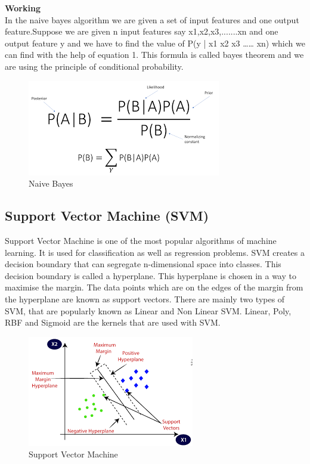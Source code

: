 \documentclass{article}
\begin{document}
\textbf{Working}\\
In the naive bayes algorithm we are given a set of input features and one output feature.Suppose we are given n input features say x1,x2,x3,.......xn and one output feature y and we have to find the value of P(y | x1 x2 x3 …… xn) which we can find with the help of equation 1. This formula is called bayes theorem and we are using the principle of conditional probability. 

\begin{figure}[h]
    \centering
    \includegraphics[scale=0.88]{nb.png}
    \caption{Naive Bayes}
\end{figure}


\subsection{Support Vector Machine (SVM)}

Support Vector Machine is one of the most popular algorithms of machine learning. It is used for classification as well as regression problems. SVM creates a decision boundary that can segregate n-dimensional space into classes. This decision boundary is called a hyperplane. This hyperplane is chosen in a way to maximise the margin. The data points which are on the edges of the margin from the hyperplane are known as support vectors. There are mainly two types of SVM, that are popularly known as Linear and Non Linear SVM. Linear, Poly, RBF and Sigmoid are the kernels that are used with SVM.


\begin{figure}[h]
    \centering
    \includegraphics[scale=0.88]{svm.png}
    \caption{Support Vector Machine}
\end{figure}
\end{document}
